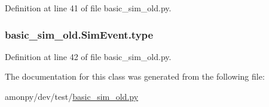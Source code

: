 Definition at line 41 of file basic\-\_\-sim\-\_\-old.\-py.

\hypertarget{classbasic__sim__old_1_1_sim_event_aa62ee00b9bd61aec1cf8d675e10bcdb1}{
\subsubsection[{type}]{\setlength{\rightskip}{0pt plus 5cm}basic\-\_\-sim\-\_\-old.\-Sim\-Event.\-type}}\label{classbasic__sim__old_1_1_sim_event_aa62ee00b9bd61aec1cf8d675e10bcdb1}


Definition at line 42 of file basic\-\_\-sim\-\_\-old.\-py.



The documentation for this class was generated from the following file\-:\begin{DoxyCompactItemize}
\item 
amonpy/dev/test/\hyperlink{basic__sim__old_8py}{basic\-\_\-sim\-\_\-old.\-py}\end{DoxyCompactItemize}
